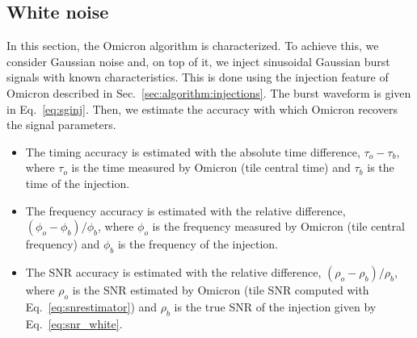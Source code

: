 \subsection{White noise} \label{sec:characterization:white}
In this section, the Omicron algorithm is characterized. To achieve this, we consider Gaussian noise and, on top of it, we inject sinusoidal Gaussian burst signals with known characteristics. This is done using the injection feature of Omicron described in Sec.~\ref{sec:algorithm:injections}. The burst waveform is given in Eq.~\ref{eq:sginj}. Then, we estimate the accuracy with which Omicron recovers the signal parameters.
\begin{itemize}
\item The timing accuracy is estimated with the absolute time difference, $\tau_o-\tau_b$, where $\tau_o$ is the time measured by Omicron (tile central time) and $\tau_b$ is the time of the injection.
\item The frequency accuracy is estimated with the relative difference, $(\phi_o-\phi_b)/\phi_b$, where $\phi_o$ is the frequency measured by Omicron (tile central frequency) and $\phi_b$ is the frequency of the injection.
\item The SNR accuracy is estimated with the relative difference, $(\rho_o-\rho_b)/\rho_b$, where $\rho_o$ is the SNR estimated by Omicron (tile SNR computed with Eq.~\ref{eq:snrestimator}) and $\rho_b$ is the true SNR of the injection given by Eq.~\ref{eq:snr_white}.
\end{itemize}

